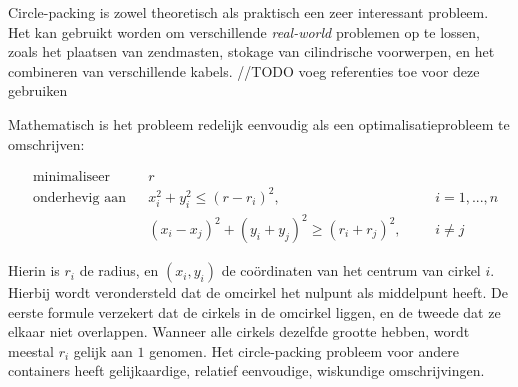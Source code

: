 \documentclass[12pt,a4paper,oneside]{book}
\begin{document}
Circle-packing is zowel theoretisch als praktisch een zeer interessant probleem.
Het kan gebruikt worden om verschillende \textit{real-world} problemen op te lossen, zoals het plaatsen van zendmasten, stokage van cilindrische voorwerpen, en het combineren van verschillende kabels. //TODO voeg referenties toe voor deze gebruiken

Mathematisch is het probleem redelijk eenvoudig als een optimalisatieprobleem te omschrijven:

\begin{equation*}
\begin{aligned}
& \text{minimaliseer}
& & r \\
& \text{onderhevig aan}
& & x_i^2 + y_i^2 \leq (r-r_i)^2, 
& & &i = {1,...,n}\\
&&& (x_i - x_j)^2 + (y_i + y_j)^2 \geq (r_i + r_j)^2,
& & &i \neq j
\end{aligned}
\end{equation*}

Hierin is $r_i$ de radius, en $(x_i,y_i)$ de coördinaten van het centrum van cirkel $i$.
Hierbij wordt verondersteld dat de omcirkel het nulpunt als middelpunt heeft.
De eerste formule verzekert dat de cirkels in de omcirkel liggen, en de tweede dat ze elkaar niet overlappen.
Wanneer alle cirkels dezelfde grootte hebben, wordt meestal $r_i$ gelijk aan $1$ genomen.
Het circle-packing probleem voor andere containers heeft gelijkaardige, relatief eenvoudige, wiskundige omschrijvingen.
\end{document}
